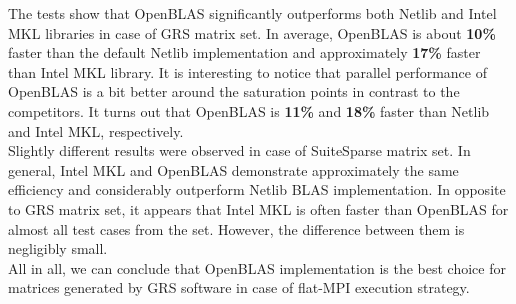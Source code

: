 The tests show that OpenBLAS significantly outperforms both Netlib and Intel MKL libraries in case of GRS matrix set. In average, OpenBLAS is about \textbf{10\%} faster than the default Netlib implementation and approximately \textbf{17\%} faster than Intel MKL library. It is interesting to notice that parallel performance of OpenBLAS is a bit better around the saturation points in contrast to the competitors. It turns out that OpenBLAS is \textbf{11\%} and \textbf{18\%} faster than Netlib and Intel MKL, respectively. \\


Slightly different results were observed in case of SuiteSparse matrix set. In general, Intel MKL and OpenBLAS demonstrate approximately the same efficiency and considerably outperform Netlib BLAS implementation. In opposite to GRS matrix set, it appears that Intel MKL is often faster than OpenBLAS for almost all test cases from the set. However, the difference between them is negligibly small.\\


All in all, we can conclude that OpenBLAS implementation is the best choice for matrices generated by GRS software in case of flat-MPI execution strategy.\\